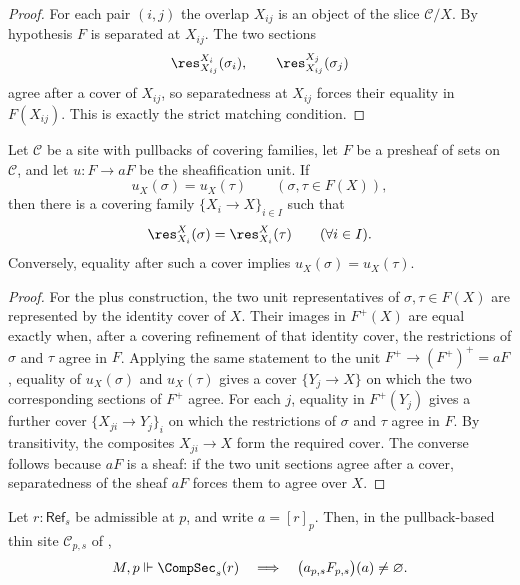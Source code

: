 \begin{proof}
For each pair $(i,j)$ the overlap $X_{ij}$ is an object of the slice
$\mathcal C/X$. By hypothesis $F$ is separated at $X_{ij}$. The two
sections
\[
\res_{X_{ij}}^{X_i}(\sigma_i),
\qquad
\res_{X_{ij}}^{X_j}(\sigma_j)
\]
agree after a cover of $X_{ij}$, so separatedness at $X_{ij}$ forces
their equality in $F(X_{ij})$. This is exactly the strict matching
condition.
\end{proof}

\begin{lemma}\label{lem:sheafification-unit-equality-local}
Let $\mathcal C$ be a site with pullbacks of covering families, let
$F$ be a presheaf of sets on $\mathcal C$, and let
$u:F\to aF$ be the sheafification unit. If
\[
u_X(\sigma)=u_X(\tau)
\qquad
(\sigma,\tau\in F(X)),
\]
then there is a covering family $\{X_i\to X\}_{i\in I}$ such that
\[
\res_{X_i}^{X}(\sigma)=\res_{X_i}^{X}(\tau)
\qquad(\forall i\in I).
\]
Conversely, equality after such a cover implies
$u_X(\sigma)=u_X(\tau)$.
\end{lemma}

\begin{proof}
For the plus construction, the two unit representatives of
$\sigma,\tau\in F(X)$ are represented by the identity cover of $X$. Their
images in $F^+(X)$ are equal exactly when, after a covering refinement of
that identity cover, the restrictions of $\sigma$ and $\tau$ agree in
$F$. Applying the same statement to the unit
$F^+\to(F^+)^+=aF$, equality of $u_X(\sigma)$ and $u_X(\tau)$ gives a cover
$\{Y_j\to X\}$ on which the two corresponding sections of $F^+$ agree.
For each $j$, equality in $F^+(Y_j)$ gives a further cover
$\{X_{ji}\to Y_j\}_i$ on which the restrictions of $\sigma$ and $\tau$
agree in $F$. By transitivity, the composites $X_{ji}\to X$ form the
required cover. The converse follows because $aF$ is a sheaf: if the two
unit sections agree after a cover, separatedness of the sheaf $aF$ forces
them to agree over $X$.
\end{proof}

\begin{proposition}\label{prop:compsec-to-sheafification}
Let $r:\mathsf{Ref}_s$ be admissible at $p$, and write $a=[r]_p$. Then, in the pullback-based thin site $\mathcal C_{p,s}$ of ,
\[
M,p\Vdash \CompSec_s(r)
\quad\Longrightarrow\quad
\bigl(a_{p,s}F_{p,s}\bigr)(a)\neq\varnothing.
\]
\end{proposition}

